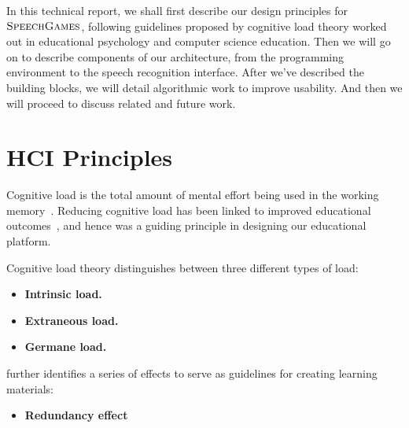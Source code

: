 \documentclass[]{article}
\def\sg{\textsc{SpeechGames}}
\begin{document}

In this technical report, we shall first describe our design principles for
$\sg$, following guidelines proposed by cognitive load theory worked out in
educational psychology and computer science education. Then we will go on to
describe components of our architecture, from the programming environment to the
speech recognition interface. After we've described the building blocks, we will
detail algorithmic work to improve usability. And then we will proceed to
discuss related and future work.

\section{HCI Principles}
Cognitive load is the total amount of mental effort being used in the working
memory~\cite{sweller1988cognitive}. Reducing cognitive load has been linked to
improved educational outcomes~\cite{kalyuga2010facilitating}, and hence was a
guiding principle in designing our educational platform.

Cognitive load theory distinguishes between three different types of load:

\begin{itemize}
  \item \textbf{Intrinsic load.}
  \item \textbf{Extraneous load.}
  \item \textbf{Germane load.}
\end{itemize}

\cite{rebetez2006control} further identifies a series of effects to serve as
guidelines for creating learning materials:

\begin{itemize}
  \item \textbf{Redundancy effect}
\end{itemize}
   
\end{document}
